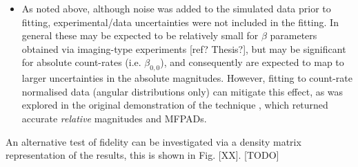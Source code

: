 \begin{itemize}
\item As noted above, although noise was added to the simulated data prior to fitting, experimental/data uncertainties were not included in the fitting. In general these may be expected to be relatively small for $\beta$ parameters obtained via imaging-type experiments [ref? Thesis?], but may be significant for absolute count-rates (i.e. $\beta_{0,0}$), and consequently are expected to map to larger uncertainties in the absolute magnitudes. However, fitting to count-rate normalised data (angular distributions only) can mitigate this effect, as was explored in the original demonstration of the technique \cite{marceau2017MolecularFrameReconstruction}, which returned accurate \textit{relative} magnitudes and MFPADs.
\end{itemize}

An alternative test of fidelity can be investigated via a density matrix representation of the results, this is shown in Fig. [XX]. [TODO]











